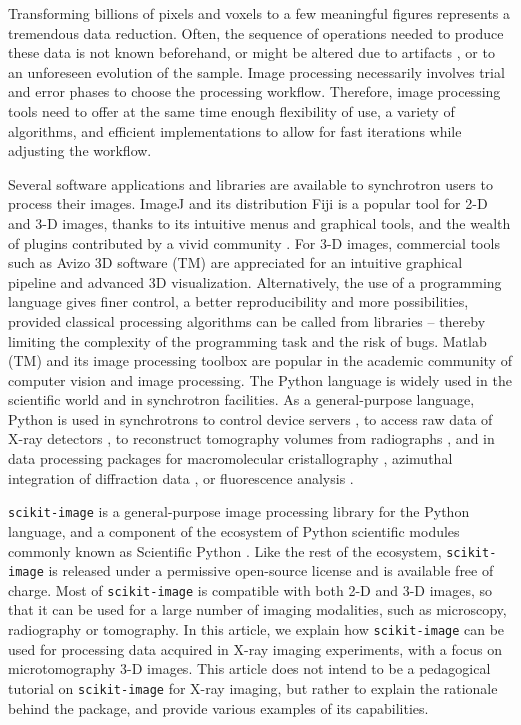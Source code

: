 \documentclass[twocolumn]{bmcart}%
\begin{document}
Transforming billions of pixels and voxels to a few meaningful figures
represents a tremendous data reduction. Often, the sequence of operations
needed to produce these data is not known beforehand, or might be altered
due to artifacts \citep{Marone2010}, or to an unforeseen evolution of
the sample. Image processing necessarily involves trial and error phases
to choose the processing workflow. Therefore, image processing tools need
to offer at the same time enough flexibility of use, a variety of
algorithms, and efficient implementations to allow for fast iterations
while adjusting the workflow.

Several software applications and libraries are available to synchrotron
users to process their images. ImageJ \citep{Abramoff2004, Schneider2012}
and its distribution Fiji \citep{Schindelin2012} is a popular tool for
2-D and 3-D images, thanks to its intuitive menus and graphical tools,
and the wealth of plugins contributed by a vivid community
\citep{Schindelin2015}. For 3-D images, commercial tools such as Avizo 3D
software (TM) are appreciated for an intuitive graphical pipeline and
advanced 3D visualization. Alternatively, the use of a programming
language gives finer control, a better reproducibility and more
possibilities, provided classical processing algorithms can be called
from libraries -- thereby limiting the complexity of the programming task
and the risk of bugs. Matlab (TM) and its image processing toolbox are
popular in the academic community of computer vision and image
processing. The Python language is widely used in the scientific world
and in synchrotron facilities. As a general-purpose language, Python is
used in synchrotrons to control device servers \citep{pytango}, to access
raw data of X-ray detectors \citep{Knudsen2013}, to reconstruct
tomography volumes from radiographs \citep{Gursoy2014, Mirone2014}, and
in data processing packages for macromolecular cristallography
\citep{Adams2010}, azimuthal integration of diffraction data
\citep{Ashiotis2015}, or fluorescence analysis \citep{pymca}.

\texttt{scikit-image} \citep{Vanderwalt2014} is a general-purpose image
processing library for the Python language, and a component of the ecosystem of
Python scientific modules commonly known as Scientific
Python \citep{Oliphant2007}. Like the rest of the ecosystem,
\texttt{scikit-image} is released under a permissive open-source license and is
available free of charge. Most of \texttt{scikit-image} is compatible with both 2-D and
3-D images, so that it can be used for a large number of imaging modalities,
such as microscopy, radiography or tomography. In this article, we explain how
\texttt{scikit-image} can be used for processing data acquired in X-ray
imaging experiments, with a focus on microtomography 3-D images. This
article does not intend to be a pedagogical tutorial on \texttt{scikit-image}
for X-ray imaging, but rather to explain the rationale behind the package, and
provide various examples of its capabilities.
\end{document}
